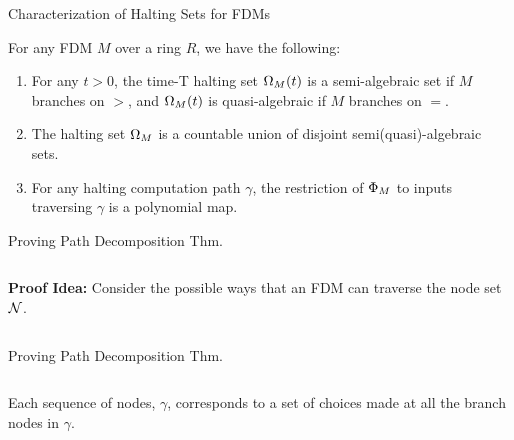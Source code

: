 \documentclass[c]{beamer}
\begin{document}
\begin{frame}{Characterization of Halting Sets for FDMs}

  \begin{theorem}
    
    For any FDM $M$ over a ring $R$, we have the following:

    \begin{enumerate}
    \item For any $t > 0$, the time-T halting set $\Omega_M(t)$ is a
      semi-algebraic set if $M$ branches on $>$, and $\Omega_M(t)$
      is quasi-algebraic if $M$ branches on $=$.

    \item The halting set $\Omega_M$ is a countable union of
      disjoint semi(quasi)-algebraic sets.

    \item For any halting computation path $\gamma$, the restriction
      of $\Phi_M$ to inputs traversing $\gamma$ is a polynomial
      map.
      
    \end{enumerate}
  \end{theorem}
\end{frame}

\begin{frame}{Proving Path Decomposition Thm.}

    \begin{columns}
      
      \textbf{Proof Idea:} Consider the possible ways that an FDM can
      traverse the node set $\mathcal{N}$.
      
      \scaletopagewidth[.9]{\mandelrecfull{}}
    \end{columns}
    
\end{frame}

\begin{frame}{Proving Path Decomposition Thm.}

    \begin{columns}
      
      Each sequence of nodes, $\gamma$, corresponds to a set of
      choices made at all the branch nodes in $\gamma$.
      
      \scaletopagewidth[.9]{\mandelrecfull{}}
    \end{columns}
    
\end{frame}
\end{document}
